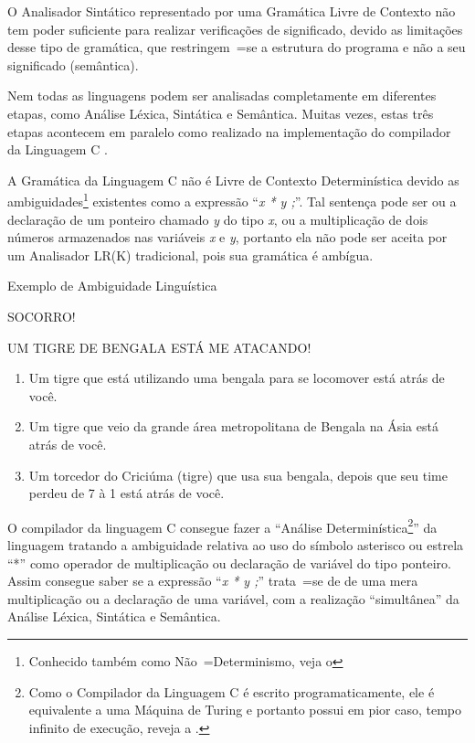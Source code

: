 O Analisador Sintático representado por uma Gramática Livre de Contexto não tem poder suficiente para realizar verificações de significado,
devido as limitações desse tipo de gramática,
que restringem~=se a estrutura do programa e
não a seu significado (semântica).

Nem todas as linguagens podem ser analisadas completamente em diferentes etapas,
como Análise Léxica, Sintática e Semântica. Muitas vezes,
estas três etapas acontecem em paralelo como realizado na implementação do compilador da Linguagem C \cite{jourdan2017,whyCcannotBeParsedWithALR1Parser}.

A Gramática da Linguagem C não é Livre de Contexto Determinística devido as ambiguidades\footnote{
Conhecido também como Não~=Determinismo,
veja o 
}
existentes como a expressão ``\textit{x * y ;}''.
Tal sentença pode ser ou
a declaração de um ponteiro chamado \textit{y} do tipo \textit{x},
ou a multiplicação de dois números armazenados nas variáveis \textit{x} e
\textit{y},
portanto ela não pode ser aceita por um Analisador LR(K) tradicional,
pois sua gramática é ambígua.

\begin{quadro}[h]
\caption{Exemplo de Ambiguidade Linguística}
\label{exemploDeAmbiguidadeLinguistica}
\begin{bluebox}
    SOCORRO!

    UM TIGRE DE BENGALA ESTÁ ME ATACANDO!

    \begin{enumerate}%
        \item Um tigre que está utilizando uma bengala para se locomover está atrás de você.
        \item Um tigre que veio da grande área metropolitana de Bengala na Ásia está atrás de você.
        \item Um torcedor do Criciúma (tigre) que usa sua bengala,
        depois que seu time perdeu de 7 à 1 está atrás de você.
    \end{enumerate}
\end{bluebox}
\end{quadro}

O compilador da linguagem C consegue fazer a ``Análise Determinística\footnote{
Como o Compilador da Linguagem C é escrito programaticamente,
ele é equivalente a uma Máquina de Turing e
portanto possui em pior caso,
tempo infinito de execução,
reveja a .
}'' da linguagem tratando a ambiguidade relativa ao uso do símbolo asterisco ou
estrela ``*'' como operador de multiplicação ou
declaração de variável do tipo ponteiro.
Assim consegue saber se a expressão ``\textit{x * y ;}'' trata~=se de de uma mera multiplicação ou
a declaração de uma variável,
com a realização ``simultânea'' da Análise Léxica,
Sintática e
Semântica.

